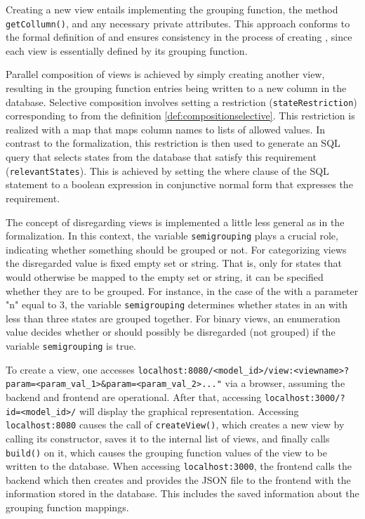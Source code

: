 \documentclass[preview]{standalone}
\begin{document}
Creating a new view entails implementing the grouping function, the method \texttt{getCollumn()}, and any necessary private attributes. This approach conforms to the formal definition of \viewsN and ensures consistency in the process of creating \viewsN, since each view is essentially defined by its grouping function.

Parallel composition of views is achieved by simply creating another view, resulting in the grouping function entries being written to a new column in the database. Selective composition involves setting a restriction (\texttt{stateRestriction}) corresponding to \compselectset from the definition \ref{def:compositionselective}. This restriction is realized with a map that maps column names to lists of allowed values. In contrast to the formalization, this restriction is then used to generate an SQL query that selects states from the database that satisfy this requirement (\texttt{relevantStates}). This is achieved by setting the where clause of the SQL statement to a boolean expression in conjunctive normal form that expresses the requirement.

The concept of disregarding views is implemented a little less general as in the formalization. In this context, the variable \texttt{semigrouping} plays a crucial role, indicating whether something should be grouped or not. For categorizing views the disregarded value is fixed empty set or string. That is, only for states that would otherwise be mapped to the empty set or string, it can be specified whether they are to be grouped. For instance, in the case of the \viewN \viewscc with a parameter "n" equal to 3, the variable \texttt{semigrouping} determines whether states in an \sccN with less than three states are grouped together. For binary views, an enumeration value decides whether \hasppty or \notppty should possibly be disregarded (not grouped) if the variable \texttt{semigrouping} is true.

To create a view, one accesses \nolinkurl{localhost:8080/<model\_id>/view:<viewname>?param=<param\_val\_1>\&param=<param\_val\_2>..."} via a browser, assuming the backend and frontend are operational. After that, accessing \nolinkurl{localhost:3000/?id=<model\_id>/} will display the graphical \viewN representation. Accessing \nolinkurl{localhost:8080} causes the call of \texttt{createView()}, which creates a new view by calling its constructor, saves it to the internal list of views, and finally calls \texttt{build()} on it, which causes the grouping function values of the view to be written to the database. When accessing \nolinkurl{localhost:3000}, the frontend calls the backend which then creates and provides the JSON file to the frontend with the information stored in the database. This includes the saved information about the grouping function mappings.
\end{document}
